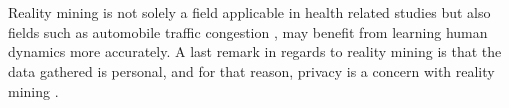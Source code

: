 \\\\
Reality mining is not solely a field applicable in health related studies but also fields such as automobile traffic congestion \parencite{pentland2009reality_mining_mobile_communication_gps}, may benefit from learning human dynamics more accurately. A last remark in regards to reality mining is that the data gathered is personal, and for that reason, privacy is a concern with reality mining \parencite{madan2009_reality_mining_privacy}.


